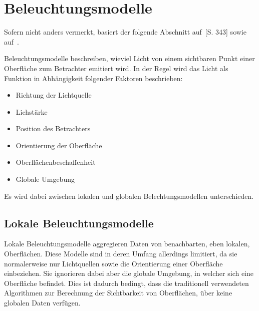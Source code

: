 
\section{Beleuchtungsmodelle}
\label{sec:illumination_models}

Sofern nicht anders vermerkt, basiert der folgende Abschnitt auf~\cite{whitted_improved_1980}[S. 343] sowie auf~\cite{hughes_computer_2013}.

Beleuchtungsmodelle beschreiben, wieviel Licht von einem sichtbaren Punkt einer Oberfläche zum Betrachter emitiert wird. In der Regel wird das Licht als Funktion in Abhängigkeit folgender Faktoren beschrieben:
\begin{itemize}
    \item Richtung der Lichtquelle \item Lichstärke
    \item Position des Betrachters
    \item Orientierung der Oberfläche
    \item Oberflächenbeschaffenheit
    \item Globale Umgebung
\end{itemize}

Es wird dabei zwischen lokalen und globalen Belechtungsmodellen unterschieden.

\subsection{Lokale Beleuchtungsmodelle}
\label{subsec:local_illumination_models}

Lokale Beleuchtungsmodelle aggregieren Daten von benachbarten, eben lokalen, Oberflächen. Diese Modelle sind in deren Umfang allerdings limitiert, da sie normalerweise nur Lichtquellen sowie die Orientierung einer Oberfläche einbeziehen. Sie ignorieren dabei aber die globale Umgebung, in welcher sich eine Oberfläche befindet.
Dies ist dadurch bedingt, dass die traditionell verwendeten Algorithmen zur Berechnung der Sichtbarkeit von Oberflächen, über keine globalen Daten verfügen.

